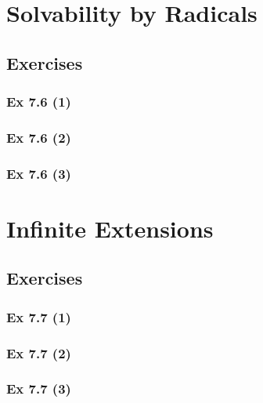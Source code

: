 \newpage		%

\section{Solvability by Radicals}\label{sec:7.6}
\subsection{Exercises}\label{sec:7.6_Exercises}

\subsubsection{Ex 7.6 (1)}\label{sec:Ex_7.6.1}

\subsubsection{Ex 7.6 (2)}\label{sec:Ex_7.6.2}

\subsubsection{Ex 7.6 (3)}\label{sec:Ex_7.6.3}

\newpage		%

\section{Infinite Extensions}\label{sec:7.7}
\subsection{Exercises}\label{sec:7.7_Exercises}

\subsubsection{Ex 7.7 (1)}\label{sec:Ex_7.7.1}

\subsubsection{Ex 7.7 (2)}\label{sec:Ex_7.7.2}

\subsubsection{Ex 7.7 (3)}\label{sec:Ex_7.7.3}


